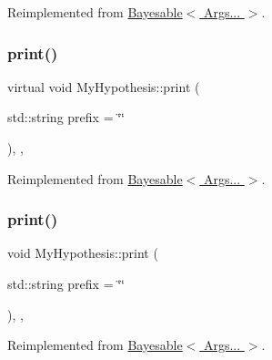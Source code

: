 Reimplemented from \hyperlink{class_bayesable_a87d5d9481d6a72b017e44b175071fa5e}{Bayesable$<$ Args... $>$}.

\mbox{\label{class_my_hypothesis_a81fa991ffd2cabe6f71ec129ae26ca6c}} 
\subsubsection{\texorpdfstring{print()}{print()}\hspace{0.1cm}{\footnotesize\ttfamily [2/3]}}
{\footnotesize\ttfamily virtual void My\+Hypothesis\+::print (\begin{DoxyParamCaption}\item[{std\+::string}]{prefix = {\ttfamily \char`\"{}\char`\"{}} }\end{DoxyParamCaption})\hspace{0.3cm}{\ttfamily [inline]}, {\ttfamily [override]}, {\ttfamily [virtual]}}



Reimplemented from \hyperlink{class_bayesable_a87d5d9481d6a72b017e44b175071fa5e}{Bayesable$<$ Args... $>$}.

\mbox{\label{class_my_hypothesis_a91fd22a2724e04c0e7c67ea4282beac4}} 
\subsubsection{\texorpdfstring{print()}{print()}\hspace{0.1cm}{\footnotesize\ttfamily [3/3]}}
{\footnotesize\ttfamily void My\+Hypothesis\+::print (\begin{DoxyParamCaption}\item[{std\+::string}]{prefix = {\ttfamily \char`\"{}\char`\"{}} }\end{DoxyParamCaption})\hspace{0.3cm}{\ttfamily [inline]}, {\ttfamily [override]}, {\ttfamily [virtual]}}



Reimplemented from \hyperlink{class_bayesable_a87d5d9481d6a72b017e44b175071fa5e}{Bayesable$<$ Args... $>$}.

\mbox{\label{class_my_hypothesis_a536a607a2008f50fb1062fd540c60063}} 
